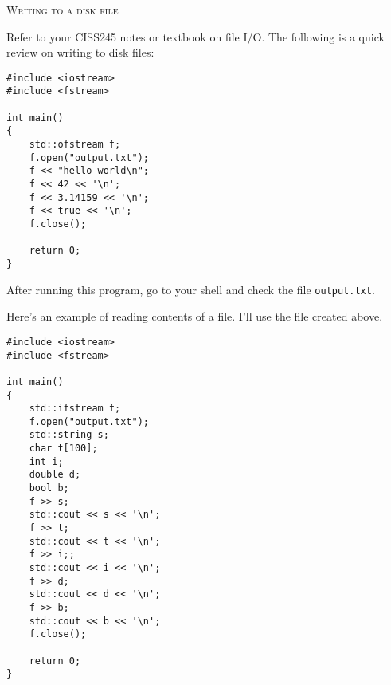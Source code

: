 \textsc{Writing to a disk file}

Refer to your CISS245 notes or textbook on file I/O.
The following is a quick review on writing to disk files:

\begin{Verbatim}[frame=single,fontsize=\footnotesize]
#include <iostream>
#include <fstream>

int main()
{
    std::ofstream f;
    f.open("output.txt");
    f << "hello world\n";
    f << 42 << '\n';
    f << 3.14159 << '\n';
    f << true << '\n';
    f.close();
  
    return 0;
}
\end{Verbatim}

After running this program, go to your shell and check the file
\texttt{output.txt}.

Here's an example of reading contents of a file.
I'll use the file created above.

\begin{Verbatim}[frame=single,fontsize=\footnotesize]
#include <iostream>
#include <fstream>

int main()
{
    std::ifstream f;
    f.open("output.txt");
    std::string s;
    char t[100];
    int i;
    double d;
    bool b;
    f >> s;
    std::cout << s << '\n';
    f >> t;
    std::cout << t << '\n';
    f >> i;;
    std::cout << i << '\n';
    f >> d;
    std::cout << d << '\n';
    f >> b;
    std::cout << b << '\n';  
    f.close();
    
    return 0;
}
\end{Verbatim}
